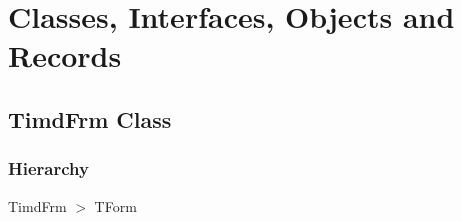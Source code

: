 \documentclass{report}
\newif\ifpdf
\begin{document}
\section{Classes, Interfaces, Objects and Records}
\ifpdf
\subsection*{\large{\textbf{TimdFrm Class}}\normalsize\hspace{1ex}\hrulefill}
\else
\subsection*{TimdFrm Class}
\fi
\label{xtypefm.TimdFrm}
\subsubsection*{\large{\textbf{Hierarchy}}\normalsize\hspace{1ex}\hfill}
TimdFrm {$>$} TForm
\end{document}
